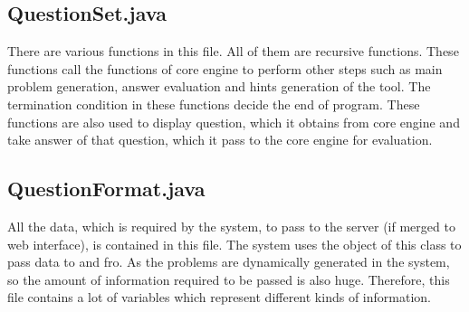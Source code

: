 \subsection{QuestionSet.java}
There are various functions in this file. All of them are recursive functions. These functions call the functions of core engine to perform other steps such as main problem generation, answer evaluation and hints generation of the tool. The termination condition in these functions decide the end of program. These functions are also used to display question, which it obtains from core engine and take answer of that question, which it pass to the core engine for evaluation.

\subsection{QuestionFormat.java}
All the data, which is required by the system, to pass to the server (if merged to web interface), is contained in this file. The system uses the object of this class to pass data to and fro. As the problems are dynamically generated in the system, so the amount of information required to be passed is also huge. Therefore, this file contains a lot of variables which represent different kinds of information.